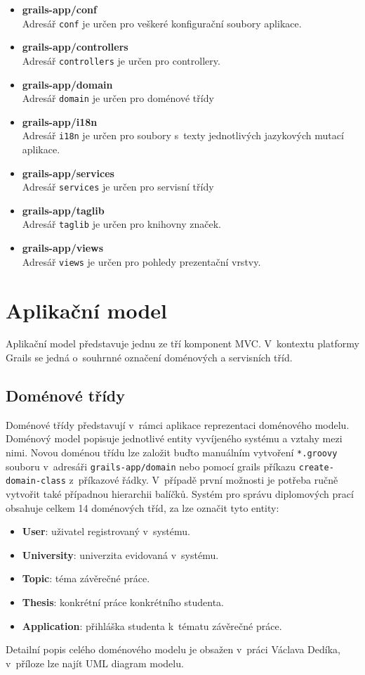 \begin{itemize}
\item \textbf{grails-app/conf}\\
Adresář \texttt{conf} je určen pro veškeré konfigurační soubory aplikace.
\item \textbf{grails-app/controllers}\\
Adresář \texttt{controllers} je určen pro controllery.
\item \textbf{grails-app/domain}\\
Adresář \texttt{domain} je určen pro doménové třídy
\item \textbf{grails-app/i18n}\\
Adresář \texttt{i18n} je určen pro soubory s~texty jednotlivých jazykových mutací aplikace.
\item \textbf{grails-app/services}\\
Adresář \texttt{services} je určen pro servisní třídy
\item \textbf{grails-app/taglib}\\
Adresář \texttt{taglib} je určen pro knihovny značek.
\item \textbf{grails-app/views}\\
Adresář \texttt{views} je určen pro pohledy prezentační vrstvy.
\end{itemize}

\section{Aplikační model}
Aplikační model představuje jednu ze tří komponent MVC. V~kontextu platformy Grails se jedná o~souhrnné označení doménových a servisních tříd.

\subsection{Doménové třídy}
Doménové třídy představují v~rámci aplikace reprezentaci doménového modelu. Doménový model popisuje jednotlivé entity vyvíjeného systému a vztahy mezi nimi. Novou doménou třídu lze založit buďto manuálním vytvoření \texttt{*.groovy} souboru v~adresáři \texttt{grails-app/domain} nebo pomocí grails příkazu \texttt{create-domain-class} z~příkazové řádky. V~případě první možnosti je potřeba ručně vytvořit také případnou hierarchii balíčků. Systém pro správu diplomových prací obsahuje celkem 14 doménových tříd, za  lze označit tyto entity:
\begin{itemize}
\item \textbf{User}: uživatel registrovaný v~systému.
\item \textbf{University}: univerzita evidovaná v~systému.
\item \textbf{Topic}: téma závěrečné práce.
\item \textbf{Thesis}: konkrétní práce konkrétního studenta.
\item \textbf{Application}: přihláška studenta k~tématu závěrečné práce.
\end{itemize}
Detailní popis celého doménového modelu je obsažen v~práci Václava Dedíka\cite{vena-bp}, v~příloze lze najít UML diagram modelu.

